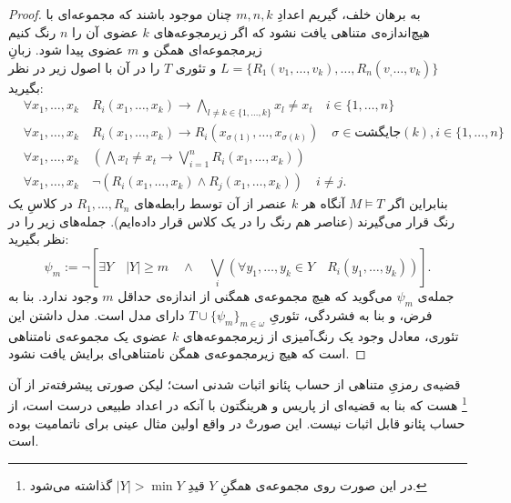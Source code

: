 \documentclass[12pt,a4paper]{report}
\theoremstyle{colorhead}
\begin{document}
\begin{proof}
به برهان خلف، گیریم اعدادِ
$m,n,k$
چنان موجود باشند که مجموعه‌ای با هیچ‌اندازه‌ی متناهی یافت نشود که اگر زیرمجوعه‌های
$k$
عضوی آن را 
$n$
رنگ کنیم زیرمجموعه‌ای
همگن و 
$m$
عضوی پیدا شود. زبانِ
$L=\{R_1(v_1,\ldots,v_k),\ldots,R_n(v_,\ldots,v_k)\}$
و تئوری
$T$
را در آن با اصول زیر در نظر بگیرید:
\begin{align*}
&\forall x_1,\ldots,x_k\quad  R_i(x_1,\ldots,x_k)\to \bigwedge_{l\not=k\in \{1,\ldots,k\}} x_l\not=x_t\quad i\in \{1,\ldots,n\}
\\
&
\forall x_1,\ldots,x_k\quad  
R_i(x_1,\ldots,x_k)\to R_i(x_{\sigma(1)},\ldots,x_{\sigma(k)})\quad \sigma\in \textbf{جایگشت}(k),
i\in \{1,\ldots,n\}
\\
&
\forall x_1,\ldots,x_k \quad \left(\bigwedge x_l\not=x_t\to \bigvee_{i=1}^n R_i(x_1,\ldots,x_k)\right)\\
&
\forall x_1,\ldots,x_k  \quad \neg \left(R_i(x_1,\ldots,x_k)\wedge R_j(x_1,\ldots,x_k)\right)\quad  i\neq j.
\end{align*}
بنابراین اگر
$M\models T$
آنگاه هر 
$k$
عنصر از آن  توسط رابطه‌های
$R_1,\ldots,R_n$
در کلاسِ یک رنگ قرار می‌گیرند (عناصر هم رنگ را در یک کلاس قرار داده‌ایم).  جمله‌های زیر را در نظر بگیرید:
\[
\psi_m:= \neg \left[\exists Y\quad |Y|\geq m\quad \wedge \quad 
\bigvee_i
\left(\forall y_1,\ldots,y_k\in Y \quad R_i(y_1,\ldots,y_k)\right)\right]. 
\]
جمله‌ی
$\psi_m$
می‌گوید که هیچ مجموعه‌ی همگنی از اندازه‌ی حداقل
$m$
وجود ندارد. 
بنا به فرض، و بنا به فشردگی، 
تئوریِ
$T\cup \{\psi_m\}_{m\in \omega}$
دارای مدل است. مدل داشتن این تئوری، معادل وجود یک رنگ‌آمیزی از زیرمجموعه‌های
$k$
عضوی یک مجموعه‌ی نامتناهی است که هیچ زیرمجموعه‌ی همگن نامتناهی‌ای برایش یافت نشود.
\end{proof}
قضیه‌ی رمزیِ متناهی از حساب پئانو اثبات شدنی است؛ 
لیکن 
صورتی پیشرفته‌تر از آن
\footnote{در این صورت روی مجموعه‌ی همگنِ
$Y$
قیدِ
$|Y|>\min Y$
گذاشته می‌شود.
}
 هست که
بنا به قضیه‌ای از
پاریس و هرینگتون
با آنکه در
اعداد طبیعی درست است،‌
از حساب
پئانو قابل اثبات نیست. این صورتْ در واقع اولین مثال عینی برای ناتمامیت بوده است. 
\end{document}

